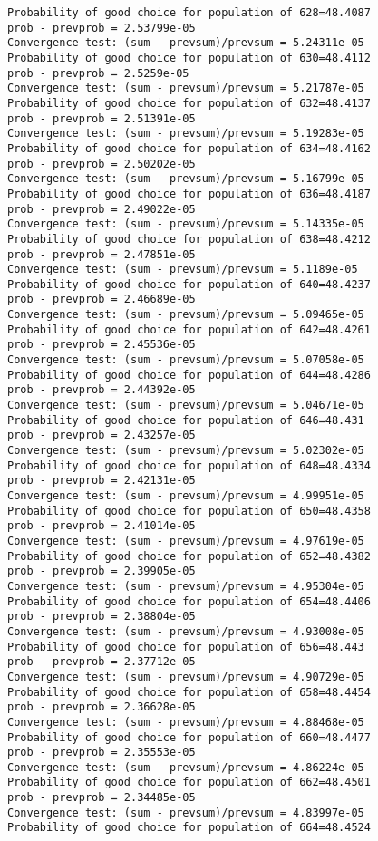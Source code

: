 \documentclass[11pt,onecolumn]{article}
\begin{document}
\begin{verbatim}
Probability of good choice for population of 628=48.4087
prob - prevprob = 2.53799e-05
Convergence test: (sum - prevsum)/prevsum = 5.24311e-05
Probability of good choice for population of 630=48.4112
prob - prevprob = 2.5259e-05
Convergence test: (sum - prevsum)/prevsum = 5.21787e-05
Probability of good choice for population of 632=48.4137
prob - prevprob = 2.51391e-05
Convergence test: (sum - prevsum)/prevsum = 5.19283e-05
Probability of good choice for population of 634=48.4162
prob - prevprob = 2.50202e-05
Convergence test: (sum - prevsum)/prevsum = 5.16799e-05
Probability of good choice for population of 636=48.4187
prob - prevprob = 2.49022e-05
Convergence test: (sum - prevsum)/prevsum = 5.14335e-05
Probability of good choice for population of 638=48.4212
prob - prevprob = 2.47851e-05
Convergence test: (sum - prevsum)/prevsum = 5.1189e-05
Probability of good choice for population of 640=48.4237
prob - prevprob = 2.46689e-05
Convergence test: (sum - prevsum)/prevsum = 5.09465e-05
Probability of good choice for population of 642=48.4261
prob - prevprob = 2.45536e-05
Convergence test: (sum - prevsum)/prevsum = 5.07058e-05
Probability of good choice for population of 644=48.4286
prob - prevprob = 2.44392e-05
Convergence test: (sum - prevsum)/prevsum = 5.04671e-05
Probability of good choice for population of 646=48.431
prob - prevprob = 2.43257e-05
Convergence test: (sum - prevsum)/prevsum = 5.02302e-05
Probability of good choice for population of 648=48.4334
prob - prevprob = 2.42131e-05
Convergence test: (sum - prevsum)/prevsum = 4.99951e-05
Probability of good choice for population of 650=48.4358
prob - prevprob = 2.41014e-05
Convergence test: (sum - prevsum)/prevsum = 4.97619e-05
Probability of good choice for population of 652=48.4382
prob - prevprob = 2.39905e-05
Convergence test: (sum - prevsum)/prevsum = 4.95304e-05
Probability of good choice for population of 654=48.4406
prob - prevprob = 2.38804e-05
Convergence test: (sum - prevsum)/prevsum = 4.93008e-05
Probability of good choice for population of 656=48.443
prob - prevprob = 2.37712e-05
Convergence test: (sum - prevsum)/prevsum = 4.90729e-05
Probability of good choice for population of 658=48.4454
prob - prevprob = 2.36628e-05
Convergence test: (sum - prevsum)/prevsum = 4.88468e-05
Probability of good choice for population of 660=48.4477
prob - prevprob = 2.35553e-05
Convergence test: (sum - prevsum)/prevsum = 4.86224e-05
Probability of good choice for population of 662=48.4501
prob - prevprob = 2.34485e-05
Convergence test: (sum - prevsum)/prevsum = 4.83997e-05
Probability of good choice for population of 664=48.4524

\end{verbatim}
\end{document}
